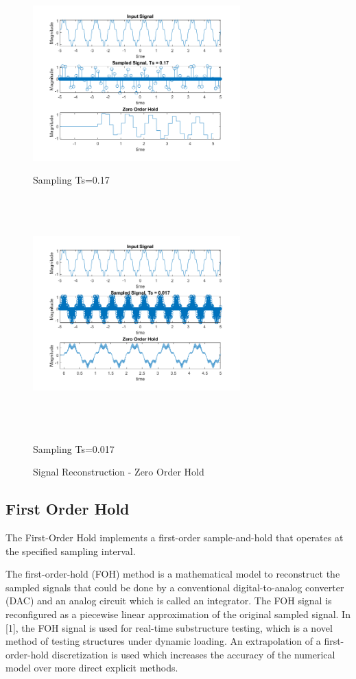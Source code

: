 \documentclass{article}
\begin{document}
    \begin{figure}[!htb]
          \includegraphics[width=8cm]{figures/Zero_Order_Hold_0.17.png}
          \caption{Sampling Ts=0.17}
        \endminipage\hfill
          \includegraphics[width=8cm, height=9cm]{figures/Zero_Order_Hold_0.017.png}
          \caption{Sampling Ts=0.017}
        \endminipage\hfill
        \caption{Signal Reconstruction - Zero Order Hold}
    \end{figure}

\subsection{First Order Hold}
The First-Order Hold implements a first-order sample-and-hold that operates at the specified sampling interval.

\cite{b1} The first-order-hold (FOH) method is a mathematical model to reconstruct the sampled signals that could be done by a conventional digital-to-analog converter (DAC) and an analog circuit which is called an integrator. The FOH signal is reconfigured as a piecewise linear approximation of the original sampled signal. In [1], the FOH signal is used for real-time substructure testing, which is a novel method of testing structures under dynamic loading. An extrapolation of a first-order-hold discretization is used which increases the accuracy of the numerical model over more direct explicit methods. 
\end{document}
